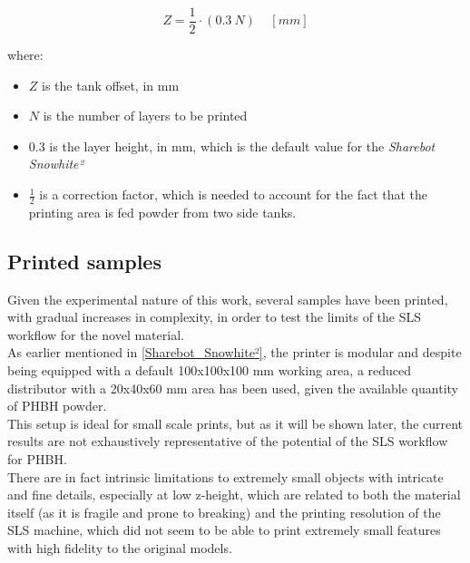 \documentclass{article}
\begin{document}
        \begin{equation}
            Z =  \frac{1}{2} \cdot (0.3 \  N) \ \ \ \ \  [mm]
            \label{eq:layer_height}
        \end{equation}
        
        
        where:
        \begin{itemize}
            \item $Z$ is the tank offset, in mm
            \item $N$ is the number of layers to be printed 
            \item $0.3$ is the layer height, in mm, which is the default value for the \textit{Sharebot Snowhite²}
            \item $\frac{1}{2}$ is a correction factor, which is needed to account for the fact that the printing area is fed powder 
            from two side tanks.
        \end{itemize}
        



        \clearpage
        \subsection{Printed samples\label{Printed_samples}}

        Given the experimental nature of this work, several samples have been printed, with gradual 
        increases in complexity, in order to test the limits of the SLS workflow for the novel material. \\ 

        As earlier mentioned in \ref{Sharebot_Snowhite²}, the printer is modular and despite being equipped 
        with a default 100x100x100 mm working area, a reduced distributor with a 20x40x60 mm area has been used, 
        given the available quantity of PHBH powder. \\ 

        This setup is ideal for small scale prints, but as it will be shown later, the current results 
        are not exhaustively representative of the potential of the SLS workflow for PHBH. \\

        There are in fact intrinsic limitations to extremely small objects with intricate and fine details,
        especially at low z-height, which are related to both the material itself (as it is fragile and prone to 
        breaking) and the printing resolution of the SLS machine, which 
        did not seem to be able to print extremely small features with high fidelity to the original models. \\
\end{document}
